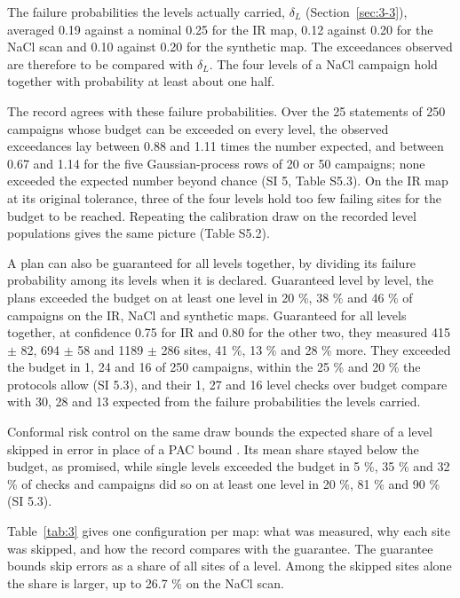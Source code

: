 \documentclass{iopjournal}
\begin{document}
The failure probabilities the levels actually carried, \(\delta_L\) (Section~\ref{sec:3-3}), averaged 0.19 against a nominal 0.25 for the IR map, 0.12 against 0.20 for the NaCl scan and 0.10 against 0.20 for the synthetic map. The exceedances observed are therefore to be compared with \(\delta_L\). The four levels of a NaCl campaign hold together with probability at least about one half.

The record agrees with these failure probabilities. Over the 25 statements of 250 campaigns whose budget can be exceeded on every level, the observed exceedances lay between 0.88 and 1.11 times the number expected, and between 0.67 and 1.14 for the five Gaussian-process rows of 20 or 50 campaigns; none exceeded the expected number beyond chance (SI 5, Table S5.3). On the IR map at its original tolerance, three of the four levels hold too few failing sites for the budget to be reached. Repeating the calibration draw on the recorded level populations gives the same picture (Table S5.2).

A plan can also be guaranteed for all levels together, by dividing its failure probability among its levels when it is declared. Guaranteed level by level, the plans exceeded the budget on at least one level in 20 \%, 38 \% and 46 \% of campaigns on the IR, NaCl and synthetic maps. Guaranteed for all levels together, at confidence 0.75 for IR and 0.80 for the other two, they measured 415 \ensuremath{\pm} 82, 694 \ensuremath{\pm} 58 and 1189 \ensuremath{\pm} 286 sites, 41 \%, 13 \% and 28 \% more. They exceeded the budget in 1, 24 and 16 of 250 campaigns, within the 25 \% and 20 \% the protocols allow (SI 5.3), and their 1, 27 and 16 level checks over budget compare with 30, 28 and 13 expected from the failure probabilities the levels carried.

Conformal risk control on the same draw bounds the expected share of a level skipped in error in place of a PAC bound \cite{Angelopoulos2024}. Its mean share stayed below the budget, as promised, while single levels exceeded the budget in 5 \%, 35 \% and 32 \% of checks and campaigns did so on at least one level in 20 \%, 81 \% and 90 \% (SI 5.3).

Table~\ref{tab:3} gives one configuration per map: what was measured, why each site was skipped, and how the record compares with the guarantee. The guarantee bounds skip errors as a share of all sites of a level. Among the skipped sites alone the share is larger, up to 26.7 \% on the NaCl scan.
\end{document}

